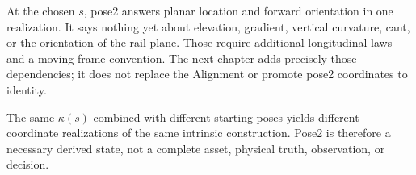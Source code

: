 At the chosen \(s\), pose2 answers planar location and forward orientation in
one realization. It says nothing yet about elevation, gradient, vertical
curvature, cant, or the orientation of the rail plane. Those require
additional longitudinal laws and a moving-frame convention. The next chapter
adds precisely those dependencies; it does not replace the Alignment or
promote pose2 coordinates to identity.

\begin{summary}
The same \(\kappa(s)\) combined with different starting poses yields different
coordinate realizations of the same intrinsic construction. Pose2 is therefore
a necessary derived state, not a complete asset, physical truth, observation,
or decision.
\end{summary}

